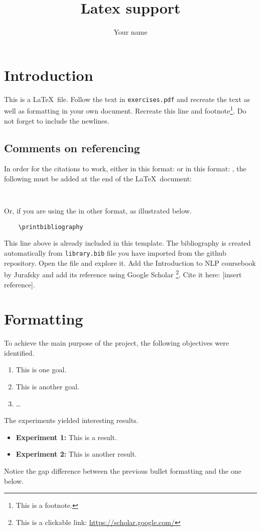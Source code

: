 \documentclass[wide]{cluu}
\title{Latex support}
\author{Your name}
\date{}
\begin{document}
\maketitle


\section{Introduction}
This is a \LaTeX\ file. Follow the text in \texttt{exercises.pdf}  and recreate the text as well as formatting in your own document.
\newline
\newline
Recreate this line and footnote\footnote{This is a footnote.}. Do not forget to include the newlines.

\subsection{Comments on referencing}
In order for the citations to work, either in this format: \citep{devlin2018bert} or in this format: \cite{devlin2018bert}, the following must be added at the end of the \LaTeX\ document:
\begin{verbatim}
    
\end{verbatim}
Or, if you are using the in other format, as illustrated below.
\begin{verbatim}
    \printbibliography
\end{verbatim}
This line above is already included in this template. The bibliography is created automatically from \texttt{library.bib} file you have imported from the github repository. Open the file and explore it. Add the Introduction to NLP coursebook by Jurafsky and add its reference using Google Scholar \footnote{This is a clickable link: \url{https://scholar.google.com/}}. Cite it here: [insert reference]. 

\section{Formatting}

To achieve the main purpose of the project, the following objectives were identified. 
\begin{enumerate}
\item This is one goal. 
\item This is another goal.
\item \ldots
\end{enumerate}
\newline
The experiments yielded interesting results. 
\begin{itemize}
\item \textbf{Experiment 1:} This is a result.
\item \textbf{Experiment 2:} This is another result.
\end{itemize}
Notice the gap difference between the previous bullet formatting and the one below. 
\end{document}
